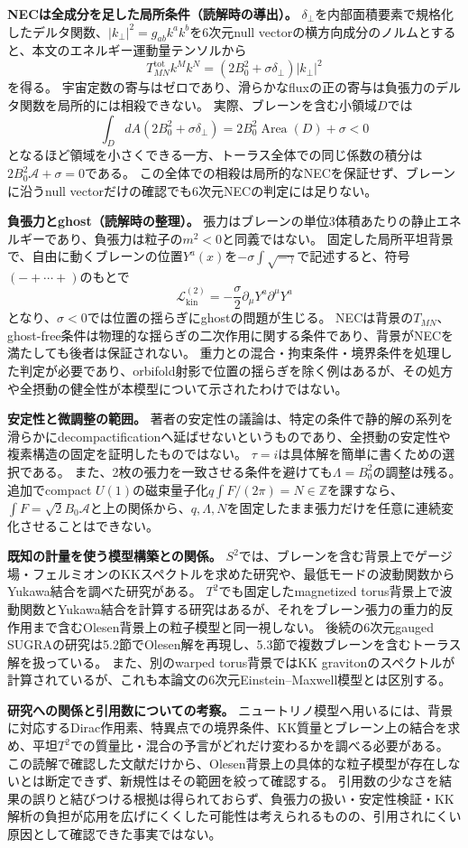 \textbf{NECは全成分を足した局所条件（読解時の導出）。}
\(\delta_\perp\)を内部面積要素で規格化したデルタ関数、\(|k_\perp|^2=g_{ab}k^ak^b\)を6次元null vectorの横方向成分のノルムとすると、本文のエネルギー運動量テンソルから
\[
 T^{\mathrm{tot}}_{MN}k^Mk^N
 =\left(2B_0^2+\sigma\delta_\perp\right)|k_\perp|^2
\]
を得る。
宇宙定数の寄与はゼロであり、滑らかなfluxの正の寄与は負張力のデルタ関数を局所的には相殺できない。
実際、ブレーンを含む小領域\(D\)では
\[
 \int_D dA\left(2B_0^2+\sigma\delta_\perp\right)
 =2B_0^2\operatorname{Area}(D)+\sigma<0
\]
となるほど領域を小さくできる一方、トーラス全体での同じ係数の積分は\(2B_0^2\mathcal A+\sigma=0\)である。
この全体での相殺は局所的なNECを保証せず、ブレーンに沿うnull vectorだけの確認でも6次元NECの判定には足りない。

\textbf{負張力とghost（読解時の整理）。}
張力はブレーンの単位3体積あたりの静止エネルギーであり、負張力は粒子の\(m^2<0\)と同義ではない。
固定した局所平坦背景で、自由に動くブレーンの位置\(Y^a(x)\)を\(-\sigma\int\sqrt{-\gamma}\)で記述すると、符号\((-+\cdots+)\)のもとで
\[
 \mathcal L^{(2)}_{\mathrm{kin}}
 =-\frac{\sigma}{2}\partial_\mu Y^a\partial^\mu Y^a
\]
となり、\(\sigma<0\)では位置の揺らぎにghostの問題が生じる。
NECは背景の\(T_{MN}\)、ghost-free条件は物理的な揺らぎの二次作用に関する条件であり、背景がNECを満たしても後者は保証されない。
重力との混合・拘束条件・境界条件を処理した判定が必要であり、orbifold射影で位置の揺らぎを除く例はあるが\cite{Parameswaran:2007NegativeTensions}、その処方や全摂動の健全性が本模型について示されたわけではない。

\textbf{安定性と微調整の範囲。}
著者の安定性の議論は、特定の条件で静的解の系列を滑らかにdecompactificationへ延ばせないというものであり、全摂動の安定性や複素構造の固定を証明したものではない\cite{Akerblom:2010OneBrane}。
\(\tau=i\)は具体解を簡単に書くための選択である。
また、2枚の張力を一致させる条件を避けても\(\Lambda=B_0^2\)の調整は残る。
追加でcompact \(U(1)\)の磁束量子化\(q\int F/(2\pi)=N\in\mathbb Z\)を課すなら、\(\int F=\sqrt{2}B_0\mathcal A\)と上の関係から、\(q,\Lambda,N\)を固定したまま張力だけを任意に連続変化させることはできない。

\textbf{既知の計量を使う模型構築との関係。}
\(S^2\)では、ブレーンを含む背景上でゲージ場・フェルミオンのKKスペクトルを求めた研究や、最低モードの波動関数からYukawa結合を調べた研究がある\cite{Parameswaran:2006SixDBrane,Imai:2019S2FluxBranes}。
\(T^2\)でも固定したmagnetized torus背景上で波動関数とYukawa結合を計算する研究はあるが\cite{Cremades:2004MagnetizedYukawa}、それをブレーン張力の重力的反作用まで含むOlesen背景上の粒子模型と同一視しない。
後続の6次元gauged SUGRAの研究は5.2節でOlesen解を再現し、5.3節で複数ブレーンを含むトーラス解を扱っている\cite{Abe:2018BPSBranes}。
また、別のwarped torus背景ではKK gravitonのスペクトルが計算されているが\cite{Andriot:2019WarpedGW}、これも本論文の6次元Einstein--Maxwell模型とは区別する。

\textbf{研究への関係と引用数についての考察。}
ニュートリノ模型へ用いるには、背景に対応するDirac作用素、特異点での境界条件、KK質量とブレーン上の結合を求め、平坦\(T^2\)での質量比・混合の予言がどれだけ変わるかを調べる必要がある。
この読解で確認した文献だけから、Olesen背景上の具体的な粒子模型が存在しないとは断定できず、新規性はその範囲を絞って確認する。
引用数の少なさを結果の誤りと結びつける根拠は得られておらず、負張力の扱い・安定性検証・KK解析の負担が応用を広げにくくした可能性は考えられるものの、引用されにくい原因として確認できた事実ではない。
